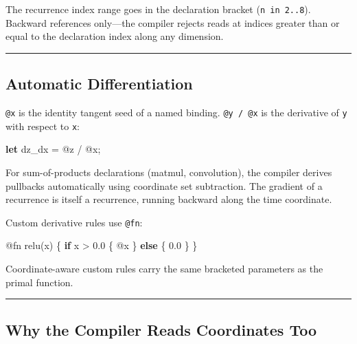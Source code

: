 \documentclass[11pt,]{article}
\newenvironment{Shaded}{}{}
\newcommand{\DecValTok}[1]{\textcolor[rgb]{0.25,0.63,0.44}{#1}}
\newcommand{\KeywordTok}[1]{\textcolor[rgb]{0.00,0.44,0.13}{\textbf{#1}}}
\newcommand{\NormalTok}[1]{#1}
\newcommand{\OperatorTok}[1]{\textcolor[rgb]{0.40,0.40,0.40}{#1}}
\begin{document}
The recurrence index range goes in the declaration bracket
(\texttt{n\ in\ 2..8}). Backward references only---the compiler rejects
reads at indices greater than or equal to the declaration index along
any dimension.

\begin{center}\rule{0.5\linewidth}{0.4pt}\end{center}

\hypertarget{automatic-differentiation}{%
\subsection{Automatic Differentiation}\label{automatic-differentiation}}

\texttt{@x} is the identity tangent seed of a named binding.
\texttt{@y\ /\ @x} is the derivative of \texttt{y} with respect to
\texttt{x}:

\begin{Shaded}
\begin{Highlighting}[]
\KeywordTok{let}\NormalTok{ dz_dx = @z / @x;}
\end{Highlighting}
\end{Shaded}

For sum-of-products declarations (matmul, convolution), the compiler
derives pullbacks automatically using coordinate set subtraction. The
gradient of a recurrence is itself a recurrence, running backward along
the time coordinate.

Custom derivative rules use \texttt{@fn}:

\begin{Shaded}
\begin{Highlighting}[]
\NormalTok{@fn relu(x) }\OperatorTok{\{}
    \KeywordTok{if}\NormalTok{ x > }\DecValTok{0.0} \OperatorTok{\{}\NormalTok{ @x }\OperatorTok{\}} \KeywordTok{else} \OperatorTok{\{} \DecValTok{0.0} \OperatorTok{\}}
\OperatorTok{\}}
\end{Highlighting}
\end{Shaded}

Coordinate-aware custom rules carry the same bracketed parameters as the
primal function.

\begin{center}\rule{0.5\linewidth}{0.4pt}\end{center}

\hypertarget{why-the-compiler-reads-coordinates-too}{%
\subsection{Why the Compiler Reads Coordinates
Too}\label{why-the-compiler-reads-coordinates-too}}
\end{document}
